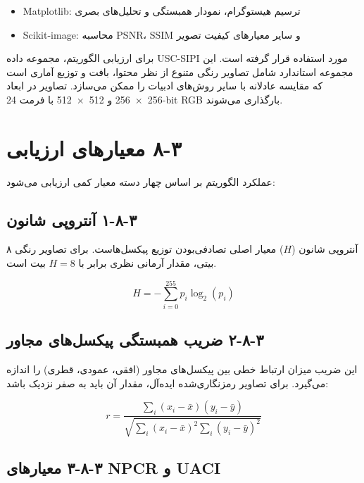 \begin{itemize}
    \item Matplotlib:  ترسیم هیستوگرام، نمودار همبستگی و تحلیل‌های بصری
\end{itemize}

\begin{itemize}
    \item Scikit-image:  محاسبه PSNR، SSIM و سایر معیارهای کیفیت تصویر
\end{itemize}

برای ارزیابی الگوریتم، مجموعه داده USC-SIPI مورد استفاده قرار گرفته است. این مجموعه استاندارد شامل تصاویر رنگی متنوع از نظر محتوا، بافت و توزیع آماری است که مقایسه عادلانه با سایر روش‌های ادبیات را ممکن می‌سازد. تصاویر در ابعاد 256 × 256 و 512 × 512 با فرمت 24-bit RGB بارگذاری می‌شوند\cite{ref3, ref4, ref9}.

\section{‏۳‏-‏۸‏ معیارهای ارزیابی}

عملکرد الگوریتم بر اساس چهار دسته معیار کمی ارزیابی می‌شود:

\subsection{‏۳‏-‏۸‏-‏۱‏ آنتروپی شانون}

آنتروپی شانون ($H$) معیار اصلی تصادفی‌بودن توزیع پیکسل‌هاست. برای تصاویر رنگی ۸ بیتی، مقدار آرمانی نظری برابر با $H=8$ بیت است.

\begin{equation}
H = -\sum_{i=0}^{255} p_i \log_2(p_i)

\end{equation}

\subsection{‏۳‏-‏۸‏-‏۲‏ ضریب همبستگی پیکسل‌های مجاور}

این ضریب میزان ارتباط خطی بین پیکسل‌های مجاور (افقی، عمودی، قطری) را اندازه می‌گیرد. برای تصاویر رمزنگاری‌شده ایده‌آل، مقدار آن باید به صفر نزدیک باشد:

\begin{equation}
r = \frac{\sum_i (x_i - \bar{x})(y_i - \bar{y})}{\sqrt{\sum_i (x_i-\bar{x})^2 \sum_i (y_i-\bar{y})^2}}

\end{equation}

\subsection{‏۳‏-‏۸‏-‏۳‏ معیارهای NPCR و UACI}

